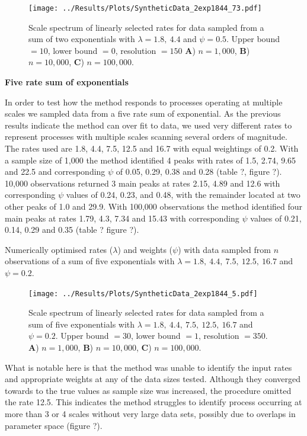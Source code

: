 \documentclass[11pt,usenames,dvipsnames]{article}
\begin{document}
\begin{figure}[H]
	\centering
	\texttt{[image: ../Results/Plots/SyntheticData\_2exp1844\_73.pdf]}
	\caption{Scale spectrum of linearly selected rates for data sampled from a sum of two exponentials with $\lambda = 1.8,\ 4.4$ and $\psi = 0.5$. Upper bound $= 10$, lower bound $= 0$, resolution $= 150$ \textbf{A}) $n = 1,000$, \textbf{B}) $n = 10,000$,  \textbf{C}) $n = 100,000$.}
\end{figure}

\noindent
\textbf{Five rate sum of exponentials}

In order to test how the method responds to processes operating at multiple scales we sampled data from a five rate sum of exponential. As the previous results indicate the method can over fit to data, we used very different rates to represent processes with multiple scales scanning several orders of magnitude. The rates used are 1.8, 4.4, 7.5, 12.5 and 16.7 with equal weightings of 0.2. With a sample size of 1,000 the method identified 4 peaks with rates of 1.5, 2.74, 9.65 and 22.5 and corresponding $\psi$ of 0.05, 0.29, 0.38 and 0.28 (table ?, figure ?). 10,000 observations returned 3 main peaks at rates 2.15, 4.89 and 12.6 with corresponding $\psi$ values of 0.24, 0.23, and 0.48, with the remainder located at two other peaks of 1.0 and 29.9. With 100,000 observations the method identified four main peaks at rates 1.79, 4.3, 7.34 and 15.43 with corresponding $\psi$ values of 0.21, 0.14, 0.29 and 0.35 (table ? figure ?). 

\begin{table}[H]
	\centering
	\caption{Numerically optimised rates ($\lambda$) and weights ($\psi$) with data sampled from $n$ observations of a sum of five exponentials with $\lambda = 1.8,\ 4.4,\ 7.5,\ 12.5,\ 16.7$ and $\psi = 0.2$.}
	
\end{table}
\begin{figure}[H]
	\centering
	\texttt{[image: ../Results/Plots/SyntheticData\_2exp1844\_5.pdf]}
	\caption{Scale spectrum of linearly selected rates for data sampled from a sum of five exponentials with $\lambda = 1.8,\ 4.4,\ 7.5,\ 12.5,\ 16.7$ and $\psi = 0.2$. Upper bound $= 30$, lower bound $= 1$, resolution $= 350$. \textbf{A}) $n = 1,000$, \textbf{B}) $n = 10,000$,  \textbf{C}) $n = 100,000$.}
\end{figure}

What is notable here is that the method was unable to identify the input rates and appropriate weights at any of the data sizes tested. Although they converged towards to the true values as sample size was increased, the procedure omitted the rate 12.5. This indicates the method struggles to identify process occurring at more than 3 or 4 scales without very large data sets, possibly due to overlaps in parameter space (figure ?).
\end{document}
